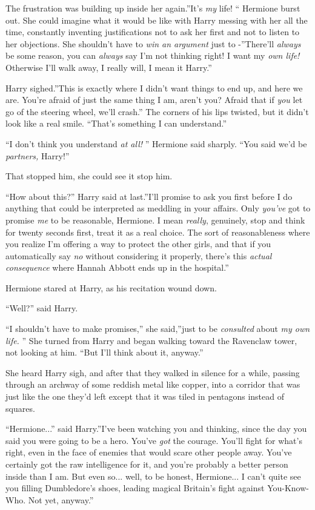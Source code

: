 The frustration was building up inside her again.''It's \emph{my} life!
`` Hermione burst out. She could imagine what it would be like with Harry
messing with her all the time, constantly inventing justifications not
to ask her first and not to listen to her objections. She shouldn't have
to \emph{win an argument} just to -''There'll \emph{always} be some
reason, you can \emph{always} say I'm not thinking right! I want my
\emph{own life!} Otherwise I'll walk away, I really will, I mean it
Harry.''

Harry sighed.''This is exactly where I didn't want things to end up, and
here we are. You're afraid of just the same thing I am, aren't you?
Afraid that if \emph{you} let go of the steering wheel, we'll crash.''
The corners of his lips twisted, but it didn't look like a real smile.
``That's something I can understand.''

``I don't think you understand \emph{at all!} '' Hermione said sharply.
``You said we'd be \emph{partners,} Harry!''

That stopped him, she could see it stop him.

``How about this?'' Harry said at last.''I'll promise to ask you first
before I do anything that could be interpreted as meddling in your
affairs. Only \emph{you've} got to promise \emph{me} to be reasonable,
Hermione. I mean \emph{really}, genuinely, stop and think for twenty
seconds first, treat it as a real choice. The sort of reasonableness
where you realize I'm offering a way to protect the other girls, and
that if you automatically say \emph{no} without considering it properly,
there's this \emph{actual consequence} where Hannah Abbott ends up in
the hospital.''

Hermione stared at Harry, as his recitation wound down.

``Well?'' said Harry.

``I shouldn't have to make promises,'' she said,''just to be
\emph{consulted} about \emph{my own life.} '' She turned from Harry and
began walking toward the Ravenclaw tower, not looking at him. ``But I'll
think about it, anyway.''

She heard Harry sigh, and after that they walked in silence for a while,
passing through an archway of some reddish metal like copper, into a
corridor that was just like the one they'd left except that it was tiled
in pentagons instead of squares.

``Hermione...'' said Harry.''I've been watching you and thinking,
since the day you said you were going to be a hero. You've \emph{got}
the courage. You'll fight for what's right, even in the face of enemies
that would scare other people away. You've certainly got the raw
intelligence for it, and you're probably a better person inside than I
am. But even so... well, to be honest, Hermione... I can't
quite see you filling Dumbledore's shoes, leading magical Britain's
fight against You-Know-Who. Not yet, anyway.''

